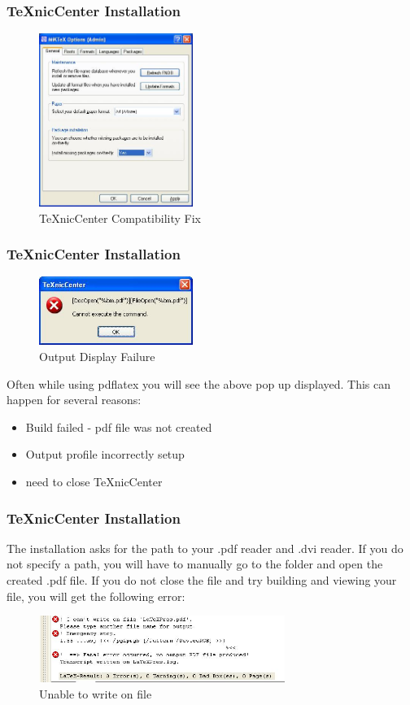 \documentclass{beamer}
\begin{document}
\begin{frame}
\frametitle{TeXnicCenter Installation}
\begin{figure}[htbp]
\centering
\includegraphics[width=5cm]{NotOnFly.jpg}
\caption{TeXnicCenter Compatibility Fix}
\label{fig::compatFix}
\end{figure}
\end{frame}


\begin{frame}
\frametitle{TeXnicCenter Installation}
\begin{figure}[htbp]
\centering
\includegraphics[width=5cm]{openIssue.jpg}
\caption{Output Display Failure}
\label{fig::openIssue}
\end{figure}

Often while using pdflatex you will see the above pop up displayed.  This can happen for several reasons:

\begin{itemize}
\item Build failed - pdf file was not created
\item Output profile incorrectly setup
\item need to close TeXnicCenter
\end{itemize}

\end{frame}

\begin{frame}
\frametitle{TeXnicCenter Installation}
The installation asks for the path to your .pdf reader and .dvi reader.  If you do not specify a path, you will have to manually go to the folder and open the created .pdf file.  If you do not close the file and try building and viewing your file, you will get the following error:

\begin{figure}[htbp]
\centering
\includegraphics[width=8cm]{Icantwrite.jpg}
\caption{Unable to write on file}
\label{fig::Icantwrite}
\end{figure}
\end{frame}
\end{document}
